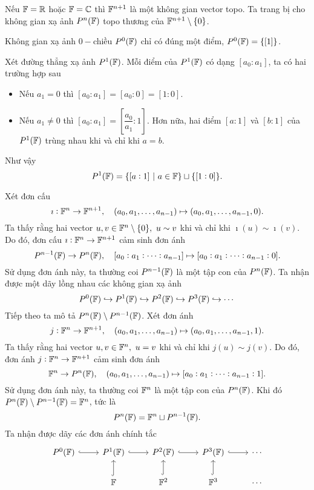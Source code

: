 Nếu $\mathbb{F} = \mathbb{R}$ hoặc $\mathbb{F} =\mathbb{C}$ thì $\mathbb{F}^{n+1}$ là một không gian vector topo. Ta trang bị cho không gian xạ ảnh $P^n(\mathbb{F})$ topo thương của $\mathbb{F}^{n+1}\setminus\{0\}$.
\begin{exam*}
    Không gian xạ ảnh $0-$chiều $P^0(\mathbb{F})$ chỉ có đúng một điểm, $P^0(\mathbb{F}) =\{[1]\}$.

    Xét đường thẳng xạ ảnh $P^1(\mathbb{F})$. Mỗi điểm của $P^1(\mathbb{F})$ có dạng $[a_0:a_1]$, ta có hai trường hợp sau
    \begin{itemize}
        \item Nếu $a_1 = 0$ thì $[a_0:a_1] = [a_0:0]=[1:0]$.
        \item Nếu $a_1\neq 0$ thì $[a_0:a_1] = \left[\dfrac{a_0}{a_1}:1\right]$. Hơn nữa, hai điểm $[a:1]$ và $[b:1]$ của $P^1(\mathbb{F})$ trùng nhau khi và chỉ khi $a=b$.
    \end{itemize}
    Như vậy \[P^1(\mathbb{F}) = \{[a:1]~|~a\in \mathbb{F}\} \sqcup \{[1:0]\}.\]
\end{exam*}
Xét đơn cấu 
\[\imath: \mathbb{F}^n \to \mathbb{F}^{n+1},\quad (a_0,a_1,\ldots,a_{n-1}) \mapsto (a_0,a_1,\ldots,a_{n-1},0).\]
Ta thấy rằng hai vector $u,v \in \mathbb{F}^{n}\setminus\{0\},~u\sim v$ khi và chỉ khi $\imath(u) \sim \imath(v)$. Do đó, đơn cấu $\imath: \mathbb{F}^n \to \mathbb{F}^{n+1}$ cảm sinh đơn ánh 
\[P^{n-1}(\mathbb{F}) \to P^{n}(\mathbb{F}),\quad [a_0:a_1:\cdots:a_{n-1}] \mapsto [a_0:a_1:\cdots:a_{n-1}:0].\]
Sử dụng đơn ánh này, ta thường coi $P^{n-1}(\mathbb{F})$ là một tập con của $P^n(\mathbb{F})$. Ta nhận được một dãy lồng nhau các không gian xạ ảnh
\[P^0(\mathbb{F}) \hookrightarrow P^1(\mathbb{F}) \hookrightarrow P^2(\mathbb{F}) \hookrightarrow P^3(\mathbb{F})\hookrightarrow \cdots\]
Tiếp theo ta mô tả $P^{n}(\mathbb{F}) \setminus P^{n-1}(\mathbb{F})$. Xét đơn ánh
\[j: \mathbb{F}^n \to \mathbb{F}^{n+1},\quad (a_0,a_1,\ldots,a_{n-1})\mapsto (a_0,a_1,\ldots,a_{n-1},1).\]
Ta thấy rằng hai vector $u,v\in \mathbb{F}^n,~u=v$ khi và chỉ khi $j(u) \sim j(v)$. Do đó, đơn ánh $j:\mathbb{F}^n \to \mathbb{F}^{n+1}$ cảm sinh đơn ánh
\[\mathbb{F}^{n}\to P^n(\mathbb{F}),\quad (a_0,a_1,\ldots,a_{n-1})\mapsto [a_0:a_1:\cdots:a_{n-1}:1].\]
Sử dụng đơn ánh này, ta thường coi $\mathbb{F}^n$ là một tập con của $P^n(\mathbb{F})$. Khi đó $P^n(\mathbb{F})\setminus P^{n-1}(\mathbb{F}) = \mathbb{F}^n$, tức là
\[P^n(\mathbb{F}) = \mathbb{F}^n \sqcup P^{n-1}(\mathbb{F}).\]
Ta nhận được dãy các đơn ánh chính tắc
\[\begin{tikzcd}
	{P^0(\F)} & {P^1(\F)} & {P^2(\F)} & {P^3(\F)} & \cdots \\
	& \F & {\F^2} & {\F^3} & \cdots
	\arrow[hook, from=1-1, to=1-2]
	\arrow[hook, from=1-2, to=1-3]
	\arrow[hook, from=1-3, to=1-4]
	\arrow[hook, from=1-4, to=1-5]
	\arrow[hook, from=2-2, to=1-2]
	\arrow[hook, from=2-3, to=1-3]
	\arrow[hook, from=2-4, to=1-4]
\end{tikzcd}\]

